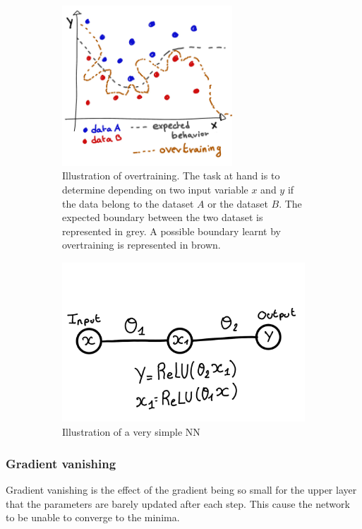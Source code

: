 \documentclass[../main.tex]{subfiles}
\begin{document}
\begin{figure}
  \centering
  \begin{subfigure}[t]{0.48\linewidth}
    \centering
    \includegraphics[height=6cm]{images/ml/overtraining.jpg}
    \caption{Illustration of overtraining. The task at hand is to determine depending on two input variable $x$ and $y$ if the data belong to the dataset $A$ or the dataset $B$. The expected boundary between the two dataset is represented in grey. A possible boundary learnt by overtraining is represented in brown.}
    \label{fig:ml:overtraining}
  \end{subfigure}
  \hfill
  \begin{subfigure}[t]{0.48\linewidth}
    \centering
    \includegraphics[height=6cm]{images/ml/vanishing_illus.jpg}
    \caption{Illustration of a very simple NN}
    \label{fig:ml:vanishing}
  \end{subfigure}
  \caption{}
\end{figure}

\subsubsection{Gradient vanishing}
Gradient vanishing is the effect of the gradient being so small for the upper layer that the parameters are barely updated after each step. This cause the network to be unable to converge to the minima.
\end{document}
